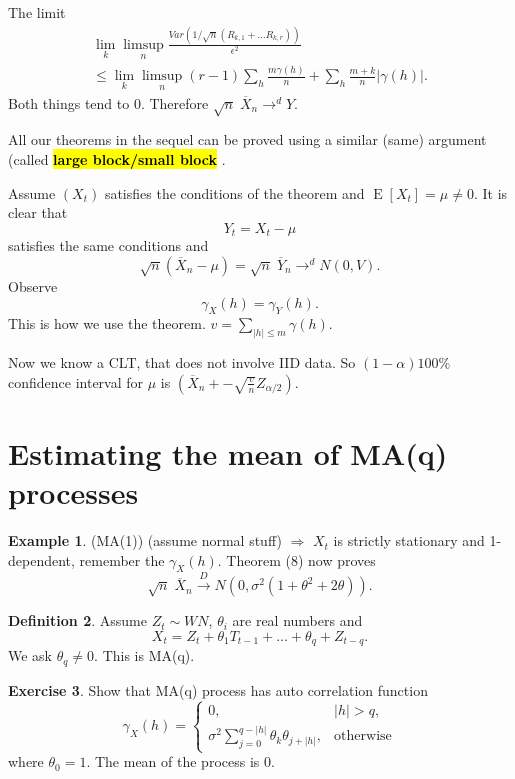 \documentclass[12pt,a4paper, notitlepage]{book}
\newcommand{\hlc}[2][yellow]{ {\sethlcolor{#1} \hl{#2}} }
\newcommand{\hlcr}[1]{\hlc[lightred]{#1}}
\theoremstyle{definition} %
\newtheorem{definition}{Definition}[section]
\newtheorem{example}[definition]{Example}
\newtheorem{exercise}[definition]{Exercise}
\theoremstyle{plain} %
\DeclareMathOperator{\E}{E}
\newcommand{\New}[1]{ {\bf \hlcr{#1} } }
\begin{document}
The limit
\begin{align*} \lim_k \limsup_n \frac{Var(1/\sqrt{n}(R_{k,1} + \dots R_{k,r}))}{\epsilon^2} \\
 \leq \lim_k \limsup_n (r-1) \sum_h \frac{m \gamma(h)}{n} + \sum_h \frac{m+k}{n}|\gamma(h)|.
\end{align*}
 Both things tend to $0$. Therefore $\sqrt{n}\; \overline{X}_n \rightarrow^d Y$. 
\endproof


All our theorems in the sequel can be proved using a similar (same) argument (called \New{ large block/small block}.

Assume $(X_t)$ satisfies the conditions of the theorem and $\E[ X_t] = \mu \neq 0$. It is clear that 
\[ Y_t = X_t - \mu \] 
satisfies the same conditions and 
\[ \sqrt{n} (\overline{X}_n - \mu) = \sqrt{n}\; \overline{Y}_n \rightarrow^d N(0,V). \]
 Observe 
\[ \gamma_X(h) = \gamma_Y(h). \]
 This is how we use the theorem. $v = \sum_{|h| \leq m} \gamma(h)$.


Now we know a CLT, that does not involve IID data. So $(1 - \alpha) 100 \%$ confidence interval for $\mu$ is 
$(\overline{X}_n +- \sqrt{\frac{v}{n}}Z_{\alpha/2})$. 

\section{Estimating the mean of MA(q) processes}

\begin{example} (MA(1))
(assume normal stuff) $\Rightarrow$ $ X_t$ is strictly stationary and 1-dependent, remember the $\gamma_X(h)$. Theorem 
(8) now proves 
\[ \sqrt{n} \; \overline{X}_n \overset{D}{ \rightarrow} N(0, \sigma^2 (1 + \theta^2 + 2\theta)) . \]
\end{example}

\begin{definition}
Assume $Z_t \sim WN$, $\theta_i$ are real numbers and 
\[ X_t = Z_t + \theta_1 T_{t-1} + \dots + \theta_q + Z_{t-q}. \]
 We ask $\theta_q \neq 0$. This is MA(q).
\end{definition}

\begin{exercise}
Show that MA(q) process has auto correlation function 
\[ \gamma_X(h) = \begin{cases} 0 , & |h| > q , \\ \sigma^2 \sum_{j = 0}^{q - |h|}\theta_k \theta_{j + |h|} , & \text{otherwise} \end{cases} \]
 where $\theta_0 = 1$. The mean of the process is $0$.
\end{exercise}
\end{document}
